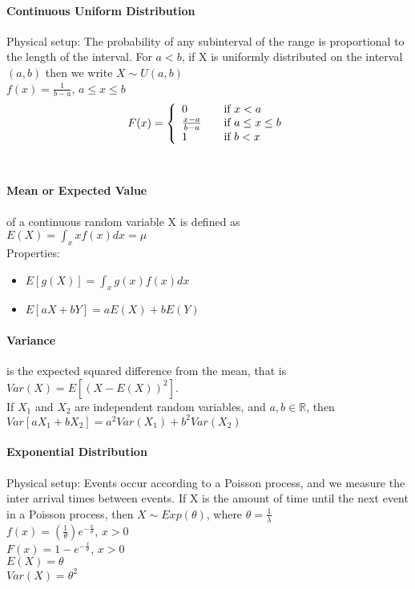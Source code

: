     \paragraph{Continuous Uniform Distribution}
      Physical setup: The probability of any subinterval of the range is
      proportional to the length of the interval. For $a < b$, if X is
      uniformly distributed on the interval $(a, b)$ then we write $X \sim U(a,
      b)$\\
      $f(x) = \frac{1}{b-a}$, $a \leq x \leq b$\\

      \[ F(x) = \left\{
        \begin{array}{l l}
          0               & \quad \text{if $x < a$}\\
          \frac{x-a}{b-a} & \quad \text{if $a \leq x \leq b$}\\
          1               & \quad \text{if $b < x$}
        \end{array}
        \right.  \]\\

    \paragraph{Mean or Expected Value} of a continuous random variable X is
    defined as\\
    $E(X) = \int_{x} xf(x) dx = \mu$\\
    Properties:
    \begin{itemize}
      \item $E[g(X)] = \int_x g(x)f(x)dx$
      \item $E[aX + bY] = aE(X) + bE(Y)$
    \end{itemize}

    \paragraph{Variance} is the expected squared difference from the mean, that
    is $Var(X) = E[(X-E(X))^2]$.\\
    If $X_1$ and $X_2$ are independent random variables, and $a, b \in
    \mathbb{R}$, then $Var[aX_1 + bX_2] = a^2 Var(X_1) + b^2Var(X_2)$

    \paragraph{Exponential Distribution}
      Physical setup: Events occur according to a Poisson process, and we
      measure the inter arrival times between events. If X is the amount of
      time until the next event in a Poisson process, then $X \sim
      Exp(\theta)$, where $\theta = \frac{1}{\lambda}$\\
      $f(x) = (\frac{1}{\theta})e^{-\frac{x}{\theta}}$, $x > 0$\\
      $F(x) = 1 - e^{-\frac{x}{\theta}}$, $x > 0$\\
      $E(X) = \theta$\\
      $Var(X) = \theta^2$

